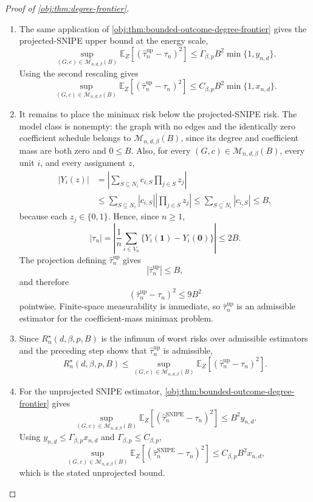 \begin{proof}[Proof of \cref{obj:thm:degree-frontier}]
\begin{enumerate}
\item
The same application of \cref{obj:thm:bounded-outcome-degree-frontier} gives the projected-SNIPE upper bound at the energy scale,
\[
\sup_{(G,c)\in\mathcal M_{n,d,\beta}(B)}
\mathbb E_Z\!\left[
\left(\widehat\tau_n^{\mathrm{up}}-\tau_n\right)^2
\right]
\le
\Gamma_{\beta,p}B^2\min\{1,y_{n,d}\}.
\]
Using the second rescaling gives
\[
\sup_{(G,c)\in\mathcal M_{n,d,\beta}(B)}
\mathbb E_Z\!\left[
\left(\widehat\tau_n^{\mathrm{up}}-\tau_n\right)^2
\right]
\le
C_{\beta,p}B^2\min\{1,x_{n,d}\}.
\] %

\item
It remains to place the minimax risk below the projected-SNIPE risk.  The model class is nonempty: the graph with no edges and the identically zero coefficient schedule belongs to \(\mathcal M_{n,d,\beta}(B)\), since its degree and coefficient mass are both zero and \(0\le B\).  Also, for every \((G,c)\in\mathcal M_{n,d,\beta}(B)\), every unit \(i\), and every assignment \(z\),
\[
\begin{aligned}
|Y_i(z)|
&=
\left|
\sum_{S\subseteq N_i}
c_{i,S}\prod_{j\in S}z_j
\right|  \\
&\le
\sum_{S\subseteq N_i}
|c_{i,S}|
\left|\prod_{j\in S}z_j\right|
\le
\sum_{S\subseteq N_i}|c_{i,S}|
\le B,
\end{aligned}
\]
because each \(z_j\in\{0,1\}\).  Hence, since \(n\ge1\),
\[
|\tau_n|
=
\left|
\frac1n\sum_{i\in V_n}
\{Y_i(\mathbf 1)-Y_i(\mathbf 0)\}
\right|
\le 2B.
\]
The projection defining \(\widehat\tau_n^{\mathrm{up}}\) gives
\[
|\widehat\tau_n^{\mathrm{up}}|\le B,
\]
and therefore
\[
\left(\widehat\tau_n^{\mathrm{up}}-\tau_n\right)^2
\le 9B^2
\]
pointwise.  Finite-space measurability is immediate, so \(\widehat\tau_n^{\mathrm{up}}\) is an admissible estimator for the coefficient-mass minimax problem. %

\item
Since \(R_n^\star(d,\beta,p,B)\) is the infimum of worst risks over admissible estimators and the preceding step shows that \(\widehat\tau_n^{\mathrm{up}}\) is admissible,
\[
R_n^\star(d,\beta,p,B)
\le
\sup_{(G,c)\in\mathcal M_{n,d,\beta}(B)}
\mathbb E_Z\!\left[
\left(\widehat\tau_n^{\mathrm{up}}-\tau_n\right)^2
\right].
\] %

\item
For the unprojected SNIPE estimator, \cref{obj:thm:bounded-outcome-degree-frontier} gives
\[
\sup_{(G,c)\in\mathcal M_{n,d,\beta}(B)}
\mathbb E_Z\!\left[
\left(\widehat\tau_n^{\mathrm{SNIPE}}-\tau_n\right)^2
\right]
\le
B^2y_{n,d}.
\]
Using \(y_{n,d}\le\Gamma_{\beta,p}x_{n,d}\) and \(\Gamma_{\beta,p}\le C_{\beta,p}\),
\[
\sup_{(G,c)\in\mathcal M_{n,d,\beta}(B)}
\mathbb E_Z\!\left[
\left(\widehat\tau_n^{\mathrm{SNIPE}}-\tau_n\right)^2
\right]
\le
C_{\beta,p}B^2x_{n,d},
\]
which is the stated unprojected bound. %


\end{enumerate}
\end{proof}
